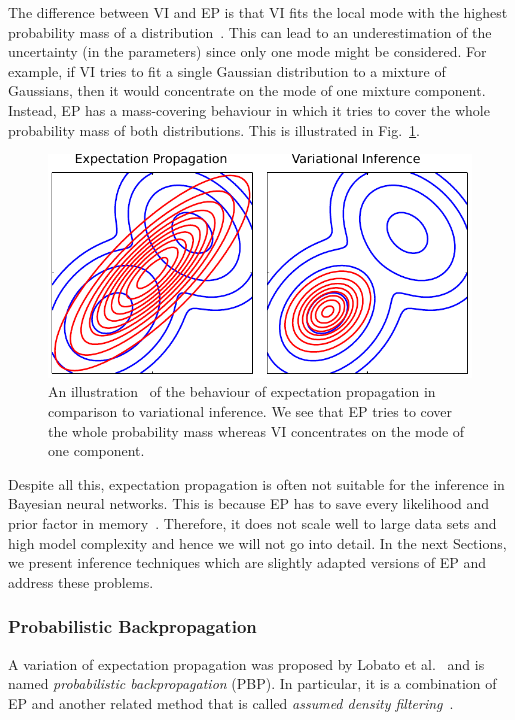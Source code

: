 \documentclass[runningheads]{llncs}
\begin{document}
The difference between VI and EP is that VI fits the local mode with the highest probability mass of a distribution~\cite{hernandez2016black}.
This can lead to an underestimation of the uncertainty (in the parameters) since only one mode might be considered.
For example, if VI tries to fit a single Gaussian distribution to a mixture of Gaussians, then it would concentrate on the mode of one mixture component. 
Instead, EP has a mass-covering behaviour in which it tries to cover the whole probability mass of both distributions. This is illustrated in Fig.~\ref{fig:EPvsVI}.
\begin{figure}
    \centering
    \includegraphics[width=.8\textwidth]{images/EPvsVI.pdf}
    \caption{An illustration~\cite{bishop:2006:PRML} of the behaviour of expectation propagation in comparison to variational inference. We see that EP tries to cover the whole probability mass whereas VI concentrates on the mode of one component.}
    \label{fig:EPvsVI}
\end{figure}

Despite all this, expectation propagation is often not suitable for the inference in Bayesian neural networks. 
This is because EP has to save every likelihood and prior factor in memory~\cite{minka2001expectation}.
Therefore, it does not scale well to large data sets and high model complexity and hence we will not go into detail.
In the next Sections, we present inference techniques which are slightly adapted versions of EP and address these problems.

\subsubsection{Probabilistic Backpropagation}
A variation of expectation propagation was proposed by Lobato et al.~\cite{hernandez2015probabilistic} and is named \textit{probabilistic backpropagation} (PBP).
In particular, it is a combination of EP and another related method that is called \textit{assumed density filtering}~\cite{minka2001expectation}.
\end{document}
